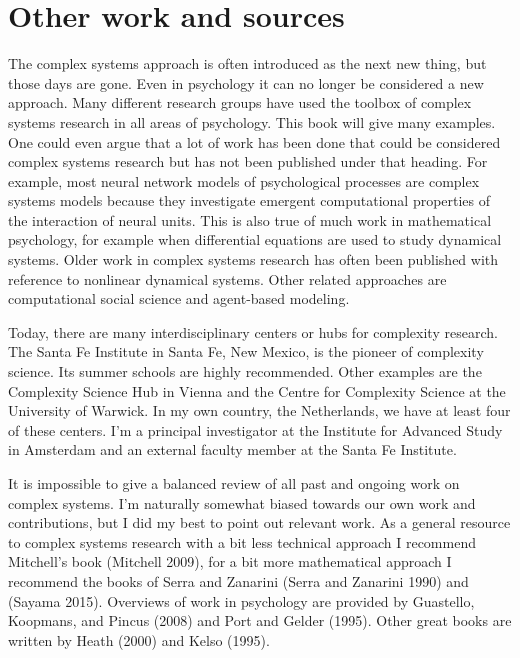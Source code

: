 \documentclass[
  a4paper,
  DIV=11,
  numbers=noendperiod]{scrreprt}
\begin{document}
\hypertarget{sec-Other-work-and-sources}{%
\section{Other work and sources}\label{sec-Other-work-and-sources}}

The complex systems approach is often introduced as the next new thing,
but those days are gone. Even in psychology it can no longer be
considered a new approach. Many different research groups have used the
toolbox of complex systems research in all areas of psychology. This
book will give many examples. One could even argue that a lot of work
has been done that could be considered complex systems research but has
not been published under that heading. For example, most neural network
models of psychological processes are complex systems models because
they investigate emergent computational properties of the interaction of
neural units. This is also true of much work in mathematical psychology,
for example when differential equations are used to study dynamical
systems. Older work in complex systems research has often been published
with reference to nonlinear dynamical systems. Other related approaches
are computational social science and agent-based modeling.

Today, there are many interdisciplinary centers or hubs for complexity
research. The Santa Fe Institute in Santa Fe, New Mexico, is the pioneer
of complexity science. Its summer schools are highly recommended. Other
examples are the Complexity Science Hub in Vienna and the Centre for
Complexity Science at the University of Warwick. In my own country, the
Netherlands, we have at least four of these centers. I'm a principal
investigator at the Institute for Advanced Study in Amsterdam and an
external faculty member at the Santa Fe Institute.

It is impossible to give a balanced review of all past and ongoing work
on complex systems. I'm naturally somewhat biased towards our own work
and contributions, but I did my best to point out relevant work. As a
general resource to complex systems research with a bit less technical
approach I recommend Mitchell's book (Mitchell 2009), for a bit more
mathematical approach I recommend the books of Serra and Zanarini (Serra
and Zanarini 1990) and (Sayama 2015). Overviews of work in psychology
are provided by Guastello, Koopmans, and Pincus (2008) and Port and
Gelder (1995). Other great books are written by Heath (2000) and Kelso
(1995).
\end{document}
